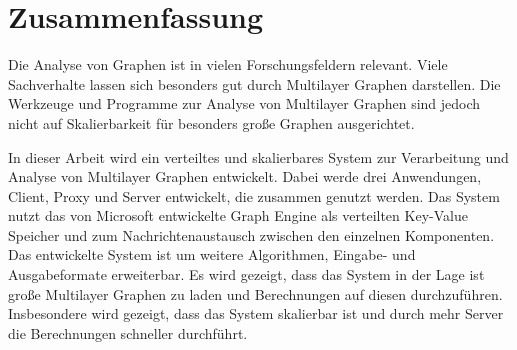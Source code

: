 
\chapter*{Zusammenfassung}


Die Analyse von Graphen ist in vielen Forschungsfeldern relevant. Viele Sachverhalte lassen sich besonders gut durch Multilayer Graphen darstellen.
Die Werkzeuge und Programme zur Analyse von Multilayer Graphen sind jedoch nicht auf Skalierbarkeit für besonders große Graphen ausgerichtet. 

In dieser Arbeit wird ein verteiltes und skalierbares System zur Verarbeitung und Analyse von Multilayer Graphen entwickelt. 
Dabei werde drei Anwendungen, Client, Proxy und Server entwickelt, die zusammen genutzt werden. 
Das System nutzt das von Microsoft entwickelte Graph Engine als verteilten Key-Value Speicher und zum Nachrichtenaustausch zwischen den einzelnen Komponenten.
Das entwickelte System ist um weitere Algorithmen, Eingabe- und Ausgabeformate erweiterbar.
Es wird gezeigt, dass das System in der Lage ist große Multilayer Graphen zu laden und Berechnungen auf diesen durchzuführen. Insbesondere wird gezeigt, dass das System skalierbar ist und durch mehr Server die Berechnungen schneller durchführt.
